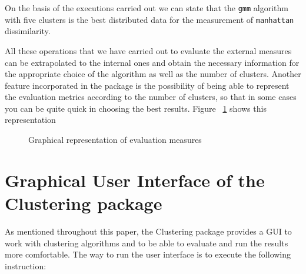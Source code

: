 On the basis of the executions carried out we can state that the \texttt{gmm} algorithm with five clusters is the best distributed data for the measurement of \texttt{manhattan} dissimilarity.

All these operations that we have carried out to evaluate the external measures can be extrapolated to the internal ones and obtain the necessary information for the appropriate choice of the algorithm as well as the number of clusters. Another feature incorporated in the package is the possibility of being able to represent the evaluation metrics according to the number of clusters, so that in some cases you can be quite quick in choosing the best results. Figure ~\ref{fig:clustering} shows this representation

\begin{figure}[htbp]
  \centering
    \qquad
    \caption{Graphical representation of evaluation measures}%
    \label{fig:clustering}%
\end{figure}

\section{Graphical User Interface of the Clustering package}

As mentioned throughout this paper, the Clustering package provides a GUI to work with clustering algorithms and to be able to evaluate and run the results more comfortable. The way to run the user interface is to execute the following instruction:

